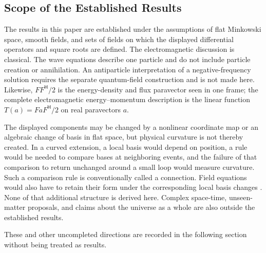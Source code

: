\documentclass[10pt,letterpaper]{article}
\newcommand{\pv}[1]{#1}
\newcommand{\Hop}{\mathsf H}
\newcommand{\herm}[1]{#1^{\Hop}}
\begin{document}
\subsection{Scope of the Established Results}
The results in this paper are established under the assumptions of flat
Minkowski space, smooth fields, and sets of fields on which the displayed
differential operators and square roots are defined. The electromagnetic
discussion is classical. The wave equations describe one particle and do
not include particle creation or annihilation. An antiparticle
interpretation of a negative-frequency solution requires the separate
quantum-field construction and is not made here. Likewise,
\(\pv{F}\herm{\pv{F}}/2\) is the energy-density and flux paravector seen in
one frame; the complete electromagnetic energy--momentum description is the
linear function
\(\pv{T}(\pv{a})=\pv{F}\pv{a}\herm{\pv{F}}/2\) on real paravectors
\(\pv{a}\).

The displayed components may be changed by a nonlinear coordinate map or an
algebraic change of basis in flat space, but physical curvature is not
thereby created. In a curved extension, a local basis would depend on
position, a rule would be needed to compare bases at neighboring events, and
the failure of that comparison to return unchanged around a small loop would
measure curvature. Such a comparison rule is conventionally called a
connection. Field equations would also have to retain their form under the
corresponding local basis changes \cite{doran2003}. None of that additional
structure is derived here. Complex space-time, unseen-matter proposals, and
claims about the universe as a whole are also outside the established
results.

These and other uncompleted directions are recorded in the following section
without being treated as results.



\clearpage
\onecolumn
\end{document}
